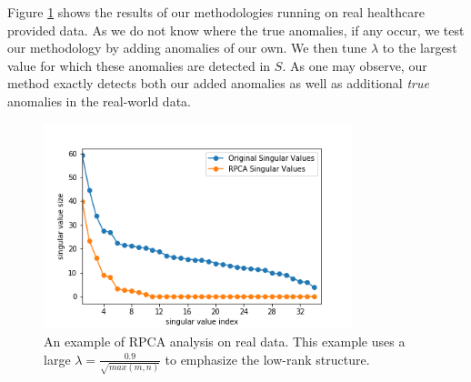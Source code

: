 \documentclass[conference]{IEEEtran}
\begin{document}



Figure \ref{fig:real_data} shows the results of our methodologies running on real healthcare provided data.  As we do not know where the true anomalies, if any occur, we test our methodology by adding anomalies of our own.  We then tune $\lambda$ to the largest value for which these anomalies are detected in $S$.  As one may observe, our method exactly detects both our added anomalies as well as additional \emph{true} anomalies in the real-world data.

\begin{figure}
    \centering
    \includegraphics[width=0.8\textwidth]{images/new_7-26-2020/real_data_svd.png}
    \caption{An example of RPCA analysis on real data. This example uses a large $\lambda=\frac{0.9}{\sqrt{max(m,n)}}$ to emphasize the low-rank structure. }
    \label{fig:real_data}
\end{figure}
\end{document}
